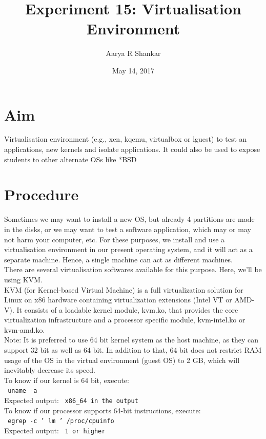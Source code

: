 \documentclass[12pt,a4paper]{article}
\title{Experiment 15: Virtualisation Environment}
\author{Aarya R Shankar}
\date{May 14, 2017}
\begin{document}
\maketitle
\section{Aim}
 
Virtualisation environment (e.g., xen, kqemu, virtualbox or lguest) to test an applications, new kernels and isolate applications. It could also be used to expose students to other alternate OSs like *BSD

\section{Procedure}

Sometimes we may want to install a new OS, but already 4 partitions are made in the disks, or we may want to test a software application, which may or may not harm your computer, etc. For these purposes, we install and use a virtualisation environment in our present operating system, and it will act as a separate machine. Hence, a single machine can act as different machines.\\
There are several virtualisation softwares available for this purpose. Here, we'll be using KVM.\\
KVM (for Kernel-based Virtual Machine) is a full virtualization solution for Linux on x86 hardware containing virtualization extensions (Intel VT or AMD-V). It consists of a loadable kernel module, kvm.ko, that provides the core virtualization infrastructure and a processor specific module, kvm-intel.ko or kvm-amd.ko.\\
Note: It is preferred to use 64 bit kernel system as the host machine, as they can support 32 bit as well as 64 bit. In addition to that, 64 bit does not restrict RAM usage of the OS in the virtual environment (guest OS) to 2 GB, which will inevitably decrease its speed.\\
To know if our kernel is 64 bit, execute:\\
\texttt{\ uname -a}\\
Expected output: \texttt{\ x86\texttt{\_}64 in the output}\\
To know if our processor supports 64-bit instructions, execute:\\
\texttt{\ egrep -c ' lm ' /proc/cpuinfo}\\
Expected output: \texttt{\ 1 or higher}\\
\end{document}

